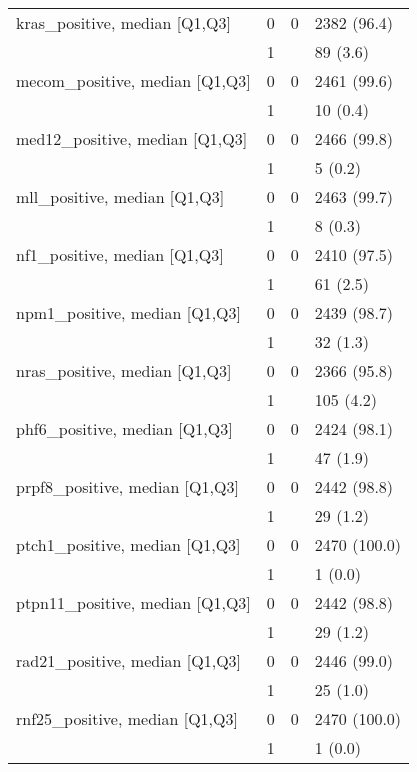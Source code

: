 \begin{tabular}{llll}
kras\_positive, median [Q1,Q3] & 0 &      0 &       2382 (96.4) \\
                 & 1 &        &          89 (3.6) \\
mecom\_positive, median [Q1,Q3] & 0 &      0 &       2461 (99.6) \\
                 & 1 &        &          10 (0.4) \\
med12\_positive, median [Q1,Q3] & 0 &      0 &       2466 (99.8) \\
                 & 1 &        &           5 (0.2) \\
mll\_positive, median [Q1,Q3] & 0 &      0 &       2463 (99.7) \\
                 & 1 &        &           8 (0.3) \\
nf1\_positive, median [Q1,Q3] & 0 &      0 &       2410 (97.5) \\
                 & 1 &        &          61 (2.5) \\
npm1\_positive, median [Q1,Q3] & 0 &      0 &       2439 (98.7) \\
                 & 1 &        &          32 (1.3) \\
nras\_positive, median [Q1,Q3] & 0 &      0 &       2366 (95.8) \\
                 & 1 &        &         105 (4.2) \\
phf6\_positive, median [Q1,Q3] & 0 &      0 &       2424 (98.1) \\
                 & 1 &        &          47 (1.9) \\
prpf8\_positive, median [Q1,Q3] & 0 &      0 &       2442 (98.8) \\
                 & 1 &        &          29 (1.2) \\
ptch1\_positive, median [Q1,Q3] & 0 &      0 &      2470 (100.0) \\
                 & 1 &        &           1 (0.0) \\
ptpn11\_positive, median [Q1,Q3] & 0 &      0 &       2442 (98.8) \\
                 & 1 &        &          29 (1.2) \\
rad21\_positive, median [Q1,Q3] & 0 &      0 &       2446 (99.0) \\
                 & 1 &        &          25 (1.0) \\
rnf25\_positive, median [Q1,Q3] & 0 &      0 &      2470 (100.0) \\
                 & 1 &        &           1 (0.0) \\

\end{tabular}

